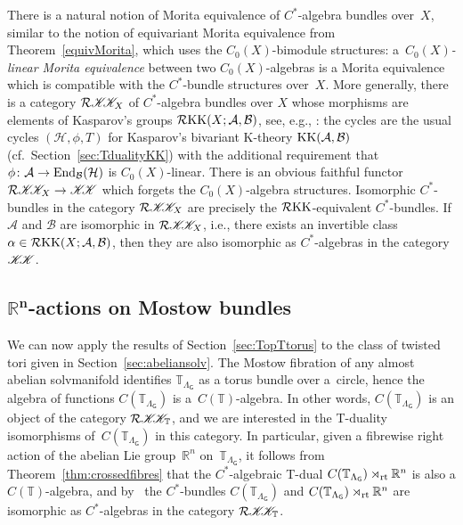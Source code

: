 \documentclass[pdftex]{sigma}
\numberwithin{equation}{section}
\newcommand{\CCK}{\mathscr{K}}
\newcommand{\sfG}{\mathsf{G}}
\newcommand{\End}{{\rm End}}
\newcommand{\rt}{{\rm rt}}
\newcommand{\R}{\real}
\newcommand{\real}{{\mathbb R}} %
\newcommand{\torus}{{\mathbb T}} %
\def\alg{{\mathcal A}}
\def\balg{{\mathcal B}}
\def\hil{{\mathcal H}}
\begin{document}
\begin{Remark}\label{rem:MoritaRKK}
There is a natural notion of Morita equivalence of $C^*$-algebra bundles over~$X$, similar to the notion of
equivariant Morita equivalence from Theorem~\ref{equivMorita}, which
uses the $C_0(X)$-bimodule structures: a~\emph{$C_0(X)$-linear Morita equivalence} between two
$C_0(X)$-algebras is a Morita equivalence which is compatible with the
$C^*$-bundle structures over~$X$. More generally, there is a category
$\mathcal{R}\CCK\hspace{-1mm}\CCK_X$ of $C^*$-algebra bundles over $X$ whose morphisms are
elements of Kasparov's groups $\mathcal{R}{\rm KK}(X;\alg,\balg)$, see, e.g., \cite{Echterhoff2009}: the cycles are the usual cycles
$(\hil,\phi,T)$ for Kasparov's bivariant K-theory ${\rm
 KK}(\alg,\balg)$ (cf.\ Section~\ref{sec:TdualityKK}) with the
additional requirement that $\phi\colon \alg\to\End_\balg(\hil)$ is
$C_0(X)$-linear. There is an obvious faithful functor
$\mathcal{R}\CCK\hspace{-1mm}\CCK_X \to \CCK\hspace{-1mm}\CCK$ which forgets the
$C_0(X)$-algebra structures. Isomorphic $C^*$-bundles in the category
$\mathcal{R}\CCK\hspace{-1mm}\CCK_X$ are precisely the $\mathcal{R}{\rm KK}$-equivalent
$C^*$-bundles. If $\alg$ and $\balg$ are isomorphic in
$\mathcal{R}\CCK\hspace{-1mm}\CCK_X$, i.e., there exists an invertible class
$\alpha\in \mathcal{R}{\rm KK}(X;\alg,\balg)$, then they are also
isomorphic as
$C^*$-algebras in the category $\CCK\hspace{-1mm}\CCK$.
\end{Remark}

\subsection[$\real^n$-actions on Mostow bundles]{$\boldsymbol{\real^n}$-actions on Mostow bundles}\label{sec:RMostow}

We can now apply the results of Section~\ref{sec:TopTtorus} to the
class of twisted tori given in
Section~\ref{sec:abeliansolv}.
The Mostow fibration of any almost abelian solvmanifold identifies
$\torus_{\Lambda_\sfG}$ as a torus bundle over a~circle, hence the
algebra of functions $C(\torus_{\Lambda_\sfG})$ is a~$C(\torus)$-algebra. In other words, $C(\torus_{\Lambda_\sfG})$ is an
object of the category $\mathcal{R}\CCK\hspace{-1mm}\CCK_\torus$, and we are
interested in the T-duality isomorphisms of~$C(\torus_{\Lambda_\sfG})$
in this category. In particular, given a fibrewise right action of the abelian
Lie group~$\R^n$ on~$\torus_{\Lambda_\sfG}$, it follows from
Theorem~\ref{thm:crossedfibres} that the $C^*$-algebraic T-dual
$C(\torus_{\Lambda_\sfG})\rtimes_\rt\R^n$ is also a $C(\torus)$-algebra, and by~\cite[Theorem~3.5]{Echterhoff2009} the $C^*$-bundles
$C(\torus_{\Lambda_\sfG})$ and
$C(\torus_{\Lambda_\sfG})\rtimes_\rt\R^n$ are isomorphic as $C^*$-algebras in the
category $\mathcal{R}\CCK\hspace{-1mm}\CCK_\torus$.
\end{document}
